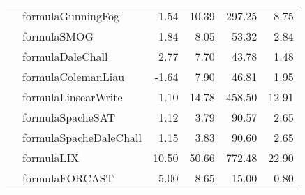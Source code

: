 \begin{tabular}{|l|l|r|r|r|r|}
 & formulaGunningFog & 1.54 & 10.39 & 297.25 & 8.75 \\ \cline{2-6}
 & formulaSMOG & 1.84 & 8.05 & 53.32 & 2.84 \\ \cline{2-6}
 & formulaDaleChall & 2.77 & 7.70 & 43.78 & 1.48 \\ \cline{2-6}
 & formulaColemanLiau & -1.64 & 7.90 & 46.81 & 1.95 \\ \cline{2-6}
 & formulaLinsearWrite & 1.10 & 14.78 & 458.50 & 12.91 \\ \cline{2-6}
 & formulaSpacheSAT & 1.12 & 3.79 & 90.57 & 2.65 \\ \cline{2-6}
 & formulaSpacheDaleChall & 1.15 & 3.83 & 90.60 & 2.65 \\ \cline{2-6}
 & formulaLIX & 10.50 & 50.66 & 772.48 & 22.90 \\ \cline{2-6}
 & formulaFORCAST & 5.00 & 8.65 & 15.00 & 0.80 \\ \hline
\end{tabular}